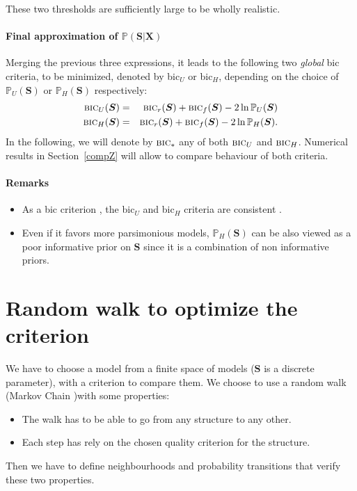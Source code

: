 \documentclass[12pt,a4paper]{report}
\begin{document}
These two thresholds are sufficiently large to be wholly realistic.

\paragraph{Final approximation of $\mathbb{P}(\boldsymbol{S}|\boldsymbol{X})$}
Merging the previous three expressions, it leads to the following two {\it global} {\sc bic} criteria, to be minimized, denoted by {\sc bic}$_U$ or {\sc bic}$_H$, depending on the choice of $\mathbb{P}_U(\boldsymbol{S})$ or $\mathbb{P}_H(\boldsymbol{S})$ respectively:
\begin{eqnarray}
\mbox{{\sc bic}}_U(\boldsymbol{S}) & = & \mbox{{\sc bic}}_r(\boldsymbol{S}) + \mbox{{\sc bic}}_f(\boldsymbol{S}) - 2\ln \mathbb{P}_U(\boldsymbol{S})  \nonumber \\
\mbox{{\sc bic}}_H(\boldsymbol{S}) & = & \mbox{{\sc bic}}_r(\boldsymbol{S}) + \mbox{{\sc bic}}_f(\boldsymbol{S}) - 2\ln \mathbb{P}_H(\boldsymbol{S}). \nonumber 
\end{eqnarray}
In the following, we will denote by $\mbox{{\sc bic}}_*$ any of both $\mbox{{\sc bic}}_U$ and $\mbox{{\sc bic}}_H$. Numerical results in Section~\ref{compZ} will allow to compare behaviour of both criteria.

\paragraph{Remarks}
\begin{itemize}
\item As a {\sc bic} criterion \cite{BIChuard}, the {\sc bic}$_U$ and {\sc bic}$_H$ criteria are consistent .
\item Even if it favors more parsimonious models, $\mathbb{P}_H(\boldsymbol{S})$ can be also viewed as a poor informative prior on $\boldsymbol{S}$ since it is a combination of non informative priors.
\end{itemize}



%	 
%	
			
			
	\section{Random walk to optimize the criterion}
		We have to choose a model from a finite space of models ($\boldsymbol{S}$ is a discrete parameter), with a criterion to compare them. We choose to use a random walk (Markov Chain \cite{robert2005monte})with some properties:
		\begin{itemize}
			\item The walk has to be able to go from any structure to any other.
			\item Each step has rely on the chosen quality criterion for the structure. 
		\end{itemize}
		Then we have to define neighbourhoods and probability transitions that verify these two properties.
\end{document}
